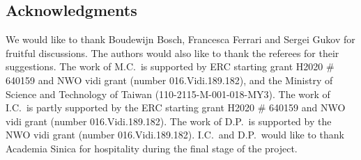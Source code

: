 \documentclass[10pt,a4paper]{amsart}
\theoremstyle{definition}
\numberwithin{equation}{section}
\begin{document}
\subsection*{Acknowledgments} We would like to thank Boudewijn Bosch,
Francesca Ferrari and Sergei Gukov for fruitful discussions.
The authors would also like to thank the referees for their suggestions.
The work of M.C.\ is supported by ERC starting grant H2020 \# 640159 and
NWO vidi grant (number 016.Vidi.189.182), and the Ministry of Science and Technology of
Taiwan (110-2115-M-001-018-MY3). The work of I.C.\ is partly supported by the
ERC starting grant H2020 \# 640159 and
NWO vidi grant (number 016.Vidi.189.182). The work of D.P.\ is supported by the NWO vidi grant (number 016.Vidi.189.182). I.C.\ and D.P.\ would like to thank Academia Sinica for hospitality during the final stage of the project.

\end{document}

